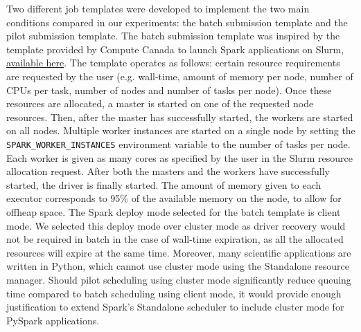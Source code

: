 	Two different job templates were developed to implement the two main
	conditions compared in our experiments: the batch submission
	template and the pilot submission template. The batch submission template was
	inspired by the template provided by Compute Canada to launch Spark applications 
	on Slurm, \href{https://docs.computecanada.ca/wiki/Apache\_Spark/en}{available here}.
	The template operates as follows: certain resource requirements are requested by
	the user (e.g. wall-time, amount of memory per node, number of CPUs per task, number 
	of nodes and number of tasks per node). Once these resources are allocated, a 
	master is started on one of the requested node resources. Then, after the master
	has successfully started, the workers are started on all nodes. Multiple worker
	instances are started on a single node by setting the \texttt{SPARK\_WORKER\_INSTANCES}
	environment variable to the number of tasks per node. Each worker is given as many
	 cores as specified by the user in the Slurm resource allocation request.
	After both the masters and the workers have successfully started, the driver is finally
	started. The amount of memory given to each executor corresponds to 95\% of the 
	available memory on the node, to allow for offheap space. 
	The Spark deploy mode selected for the batch template is client mode. We selected this
	deploy mode over cluster mode as driver recovery would not be required in batch in the
	case of wall-time expiration, as all the allocated resources will expire at the same time.
	Moreover, many scientific applications are written in Python, which cannot use cluster mode using
	the Standalone resource manager. Should pilot scheduling using cluster mode significantly reduce
	queuing time compared to batch scheduling using client mode, it would provide enough justification to extend
	Spark's Standalone scheduler to include cluster mode for PySpark applications.
    

